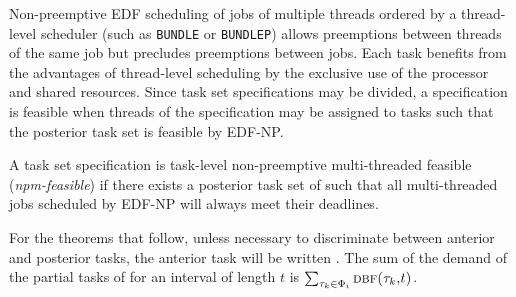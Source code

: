 \documentclass[a4paper,UKenglish,cleveref,autoref,english]{lipics-v2019}
\newcommand{\bundlep}{\texttt{BUNDLEP}}
\newcommand{\bundle}{\texttt{BUNDLE}}
\begin{document}
Non-preemptive EDF scheduling of jobs of multiple threads ordered by a
thread-level scheduler (such as \bundle{} or \bundlep{}) allows
preemptions between threads of the same job but precludes preemptions
between jobs. Each task benefits from the advantages of thread-level
scheduling by the exclusive use of the processor and shared
resources. Since task set specifications may be divided, a
specification is feasible when threads of the specification \ants{}
may be assigned to tasks such that the posterior task set \tasks{} is
feasible by EDF-NP. 

\begin{definition}
  A task set specification \ants{} is task-level non-preemptive
  multi-threaded feasible (\emph{npm-feasible}) if there exists a
  posterior task set \tasks{} of \ants{} such that all multi-threaded
  jobs scheduled by EDF-NP will always meet their deadlines. 
\end{definition}

For the theorems that follow, unless necessary to discriminate between
anterior and posterior tasks, the anterior task  will be
written . The sum of the demand of the partial tasks of
 for an interval of length ${t}$ is ${\sum_{\tau_{k} \in
    \Phi_i} \text{\sc{dbf}(\ensuremath{\tau_{k}},$t$)}}$.  

\setcounter{__lastdef}{\value{theorem}}
\setcounter{theorem}{0} %
\end{document}
